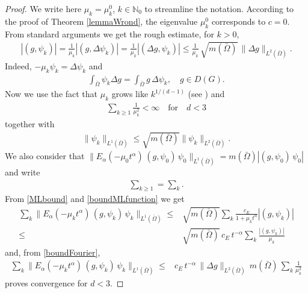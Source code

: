 \documentclass[11pt,a4paper]{article}
\begin{document}
\begin{proof}
We write here $\mu_k = \mu_k^0$, $k \in \mathbb{N}_0$ to streamline the notation. According to the proof of Theorem \ref{lemmaWrond}, the eigenvalue $\mu_k^0$ corresponds to $c=0$. From standard arguments we get the rough estimate, for $k>0$,
\begin{align}
|(g , \psi_k)| = \frac{1}{\mu_k} |(g, \Delta \psi_k )| = \frac{1}{\mu_k} |(\Delta g,\psi_k )| \leq \frac{1}{\mu_k}\, \sqrt{m(\bar{\Omega})}\, \| \Delta g \|_{L^2(\bar{\Omega})}.
\label{boundFourier}
\end{align}
Indeed, $-\mu_k \psi_k = \Delta \psi_k$ and
\begin{align*}
\int_{\bar{\Omega}} \psi_k \Delta g = \int_{\bar{\Omega}} g \, \Delta \psi_k, \quad g \in D(G).
\end{align*}
Now we use the fact that $\mu_k$ grows like $k^{1/(d-1)}$ (see \cite[Section 4]{vBelFra}) and
\begin{align}
\sum_{k \geq 1} \frac{1}{\mu_k^2} < \infty \quad \textrm{for} \quad d < 3
\label{condConvEig}
\end{align}
together with
\begin{align*}
\| \psi_k \|_{L^1(\bar{\Omega})} \leq \sqrt{m(\bar{ \Omega})} \|\psi_k\|_{L^2(\bar{\Omega})}.
\end{align*}
We also consider that $\| E_\alpha(-\mu_0 t^\alpha)\, (g, \psi_0)\, \psi_0 \|_{L^1(\bar{\Omega})} = m(\bar{\Omega}) |(g, \psi_0)\, \psi_0|$ and write
\begin{align*}
\sum_{k \geq 1} = \sum_k.
\end{align*} 
From \eqref{MLbound} and \eqref{boundMLfunction} we get
\begin{align*}
\sum_{k} \| E_\alpha(-\mu_k t^\alpha)\, (g, \psi_k)\, \psi_k \|_{L^1(\bar{\Omega})} \leq & \sqrt{m(\bar{ \Omega})} \sum_{k} \frac{c_E}{1 + \mu_k t^\alpha} |(g, \psi_k)|\\ 
\leq & \sqrt{m(\bar{ \Omega})}\, c_E\, t^{-\alpha} \sum_k \frac{|(g, \psi_k)|}{\mu_k}
\end{align*}
and, from \eqref{boundFourier},
\begin{align}
\sum_k \| E_\alpha(-\mu_k t^\alpha)\, (g, \psi_k)\, \psi_k \|_{L^1(\bar{\Omega})} \leq &  c_E\, t^{-\alpha}\, \| \Delta g \|_{L^2(\bar{\Omega})} \, m(\bar{ \Omega})\,\sum_k \frac{1}{\mu^2_k}
\label{ConvSg}
\end{align}
proves convergence for $d<3$. 


\end{proof}
\end{document}
